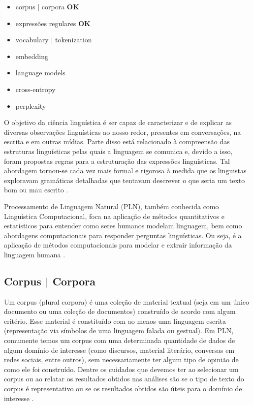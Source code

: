 \documentclass{automatextcc}
\begin{document}
\begin{itemize}
    \item corpus | corpora \textbf{OK}
    \item expressões regulares \textbf{OK}
    \item vocabulary | tokenization
    \item embedding
    \item language models
    \item cross-entropy
    \item perplexity
\end{itemize}

O objetivo da ciência linguística é ser capaz de caracterizar e de explicar as diversas observações linguísticas ao nosso redor, presentes em conversações, na escrita e em outras mídias. Parte disso está relacionado à compreensão das estruturas linguísticas pelas quais a linguagem se comunica e, devido a isso, foram propostas regras para a estruturação das expressões linguísticas. Tal abordagem tornou-se cada vez mais formal e rigorosa à medida que os linguistas exploravam gramáticas detalhadas que tentavam descrever o que seria um texto bom ou mau escrito \citep{manning1999}.

Processamento de Linguagem Natural (PLN), também conhecida como Linguística Computacional, foca na aplicação de métodos quantitativos e estatísticos para entender como seres humanos modelam linguagem, bem como abordagens computacionais para responder perguntas linguísticas. Ou seja, é a aplicação de métodos computacionais para modelar e extrair informação da linguagem humana \citep{kamath2019}. 



\subsection{Corpus | Corpora}
Um corpus (plural corpora) é uma coleção de material textual (seja em um único documento ou uma coleção de documentos) construído de acordo com algum critério. Esse material é constituído com ao menos uma linguagem escrita (representação via símbolos de uma linguagem falada ou gestual). Em PLN, comumente temos um corpus com uma determinada quantidade de dados de algum domínio de interesse (como discursos, material literário, conversas em redes sociais, entre outros), sem necessariamente ter algum tipo de opinião de como ele foi construído. Dentre os cuidados que devemos ter ao selecionar um corpus ou ao relatar os resultados obtidos nas análises são se o tipo de texto do corpus é representativo ou se os resultados obtidos são úteis para o domínio de interesse \citep{manning1999, kamath2019}.
\end{document}
